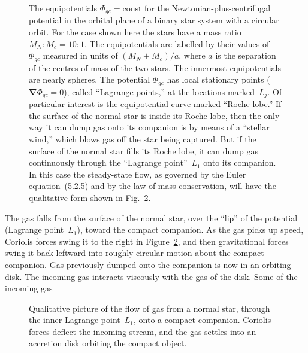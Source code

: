 \begin{figure}[htbp]
\centering
\caption{The equipotentials $\Phi_{gc}=\text{const}$ for the
Newtonian-plus-centrifugal potential in the orbital plane of a binary star
system with a circular orbit.  For the case shown here the stars have a
mass ratio $M_N\!:\!M_c=10\!:\!1$.  The equipotentials are labelled by
their values of $\Phi_{gc}$ measured in units of $(M_N+M_c)/a$, where $a$
is the separation of the centres of mass of the two stars.  The innermost
equipotentials are nearly spheres.  The potential $\Phi_{gc}$ has local
stationary points ($\boldsymbol{\nabla}\Phi_{gc}=0$), called ``Lagrange
points,'' at the locations marked~$L_j$.  Of particular interest is the
equipotential curve marked ``Roche lobe.''  If the surface of the normal
star is inside its Roche lobe, then the only way it can dump gas onto its
companion is by means of a ``stellar wind,'' which blows gas off the star
being captured.  But if the surface of the normal star fills its Roche
lobe, it can dump gas continuously through the ``Lagrange point''~$L_1$
onto its companion.  In this case the steady-state flow, as governed by
the Euler equation~(5.2.5) and by the law of mass conservation,
will have the qualitative form shown in Fig.~\ref{fig:5.2.2}.}
\label{fig:5.2.1}
\end{figure}

The gas falls from the surface of the normal star, over the ``lip'' of the
potential (Lagrange point~$L_1$), toward the compact companion.  As the gas
picks up speed, Coriolis forces swing it to the right in
Figure~\ref{fig:5.2.2}, and then gravitational forces swing it back leftward
into roughly circular motion about the compact companion.  Gas previously
dumped onto the companion is now in an orbiting disk.  The incoming gas
interacts viscously with the gas of the disk.  Some of the incoming gas

\begin{figure}[htbp]
\centering
\caption{Qualitative picture of the flow of gas from a normal star,
through the inner Lagrange point~$L_1$, onto a compact companion.
Coriolis forces deflect the incoming stream, and the gas settles into an
accretion disk orbiting the compact object.}
\label{fig:5.2.2}
\end{figure}

